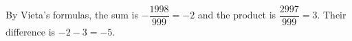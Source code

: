 By Vieta's formulas, the sum is $-\dfrac{1998}{999}=-2$ and the product is $\dfrac{2997}{999}=3$. Their difference is $-2-3=\boxed{-5}$.
